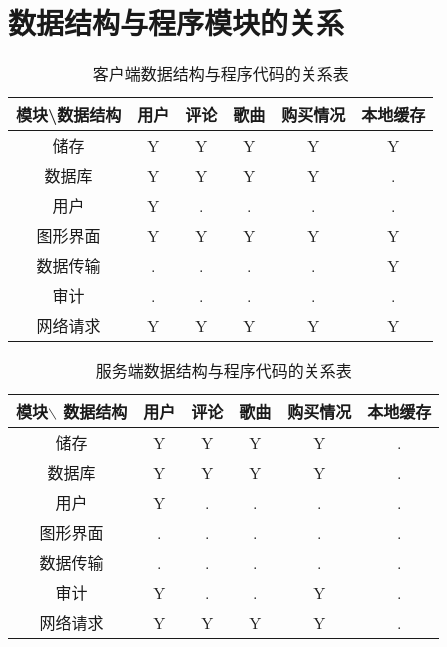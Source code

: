 \section{数据结构与程序模块的关系}
\begin{table}[htbp]
\centering
\caption{客户端数据结构与程序代码的关系表} \label{tab:datastructure-module-client}
\begin{tabular}{|c|c|c|c|c|c|}
    \hline
    模块\backslash 数据结构 & 用户 & 评论 & 歌曲 & 购买情况 & 本地缓存 \\
    \hline
    储存 & Y & Y & Y & Y & Y \\
    \hline
    数据库 & Y & Y & Y & Y & . \\
    \hline
    用户 & Y & . & . & . & . \\
    \hline
    图形界面 & Y & Y & Y & Y & Y \\
    \hline
    数据传输 & . & . & . & . & Y \\
    \hline
    审计 & . & . & . & . & . \\
    \hline
    网络请求 & Y & Y & Y & Y & Y \\
    \hline
\end{tabular}
\end{table}

\begin{table}[htbp]
    \centering
    \caption{服务端数据结构与程序代码的关系表} \label{tab:datastructure-module-server}
    \begin{tabular}{|c|c|c|c|c|c|}
        \hline
        模块$\backslash$ 数据结构 & 用户 & 评论 & 歌曲 & 购买情况 & 本地缓存 \\
        \hline
        储存 & Y & Y & Y & Y & . \\
        \hline
        数据库 & Y & Y & Y & Y & . \\
        \hline
        用户 & Y & . & . & . & . \\
        \hline
        图形界面 & . & . & . & . & . \\
        \hline
        数据传输 & . & . & . & . & . \\
        \hline
        审计 & Y & . & . & Y & . \\
        \hline
        网络请求 & Y & Y & Y & Y & . \\
        \hline
    \end{tabular}
    \end{table}